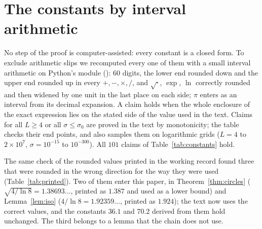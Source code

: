 \section{The constants by interval arithmetic}
\label{app:constants}

No step of the proof is computer-assisted: every constant is a closed form.
To exclude arithmetic slips we recomputed every one of them with a small interval arithmetic on Python's  module (): $60$ digits, the lower end rounded down and the upper end rounded up in every $+,-,\times,/$, and $\sqrt\cdot$, $\exp$, $\ln$ correctly rounded and then widened by one unit in the last place on each side; $\pi$ enters as an interval from its decimal expansion.
A claim holds when the whole enclosure of the exact expression lies on the stated side of the value used in the text.
Claims for all $L\ge4$ or all $\sigma\le\sigma_0$ are proved in the text by monotonicity; the table checks their end points, and  also samples them on logarithmic grids ($L=4$ to $2\times10^7$, $\sigma=10^{-15}$ to $10^{-300}$).
All $101$ claims of Table~\ref{tab:constants} hold.

The same check of the rounded values printed in the working record found three that were rounded in the wrong direction for the way they were used (Table~\ref{tab:printed}).
Two of them enter this paper, in Theorem~\ref{thm:circles} ($\sqrt{4/\ln8}=1.38693\ldots$, printed as $1.387$ and used as a lower bound) and Lemma~\ref{lem:iso} ($4/\ln8=1.92359\ldots$, printed as $1.924$); the text now uses the correct values, and the constants $36.1$ and $70.2$ derived from them hold unchanged.
The third belongs to a lemma that the chain does not use.




